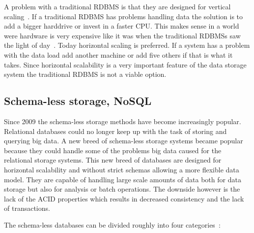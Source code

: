 A problem with a traditional RDBMS is that they are designed for vertical scaling~\cite{Atzeni:TheRelationalModelIsDead}. If a traditional RDBMS has problems handling data the solution is to add a bigger harddrive or invest in a faster CPU. This makes sense in a world were hardware is very expensive like it was when the traditional RDBMSs saw the light of day~\cite{Stonebraker:TheEndOfAnArchitecturalEra}. Today horizontal scaling is preferred. If a system has a problem with the data load add another machine or add five others if that is what it takes. Since horizontal scalability is a very important feature of the data storage system the traditional RDBMS is not a viable option.

\subsection{Schema-less storage, NoSQL}
\label{sec:nosql}
Since 2009 the schema-less storage methods have become increasingly popular.
Relational databases could no longer keep up with the task of storing and querying big data.
A new breed of schema-less storage systems became popular because they could handle some of the problems big data caused for the relational storage systems.
This new breed of databases are designed for horizontal scalability and without strict schemas allowing a more flexible data model. 
They are capable of handling large scale amounts of data both for data storage but also for analysis or batch operations.
The downside however is the lack of the ACID properties which results in decreased consistency and the lack of transactions. %

The schema-less databases can be divided roughly into four categories~\cite{Fowler:IntroNoSQL, Moniruzzaman:NoSQLDatabaseNewEraOfDatabasesForBigDataAnalysis}:

